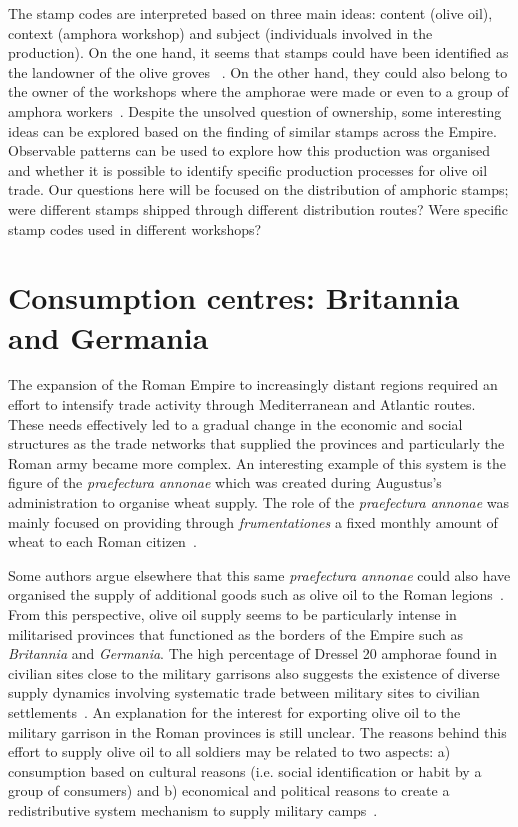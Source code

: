 The stamp codes are interpreted based on three main ideas: content (olive oil), context (amphora workshop) and subject (individuals involved in the production). On the one hand, it seems that stamps could have been identified as the landowner of the olive groves~ \citep{rodriguez_economioleicola_1977}. On the other hand, they could also belong to the owner of the workshops where the amphorae were made or even to a group of amphora workers~\citep{berni_millet_epigrafianforica_2008}. Despite the unsolved question of ownership, some interesting ideas can be explored based on the finding of similar stamps across the Empire. Observable patterns can be used to explore how this production was organised and whether it is possible to identify specific production processes for olive oil trade. Our questions here will be focused on the distribution of amphoric stamps; were different stamps shipped through different distribution routes? Were specific stamp codes used in different workshops?

\section{Consumption centres: Britannia and Germania}
\label{sec:3}

The expansion of the Roman Empire to increasingly distant regions required an effort to intensify trade activity through Mediterranean and Atlantic routes. These needs effectively led to a gradual change in the economic and social structures as the trade networks that supplied the provinces and particularly the Roman army became more complex. An interesting example of this system is the figure of the \textit{praefectura annonae} which was created during Augustus's administration to organise wheat supply. The role of the \textit{praefectura annonae} was mainly focused on providing through \textit{frumentationes} a fixed monthly amount of wheat to each Roman citizen~\citep{remesal_annona_1986,remesal_concierto}.

Some authors argue elsewhere that this same \textit{praefectura annonae} could also have organised the supply of additional goods such as olive oil to the Roman legions~\citep{remesal_annona_1986,remesal_annona_1990}. From this perspective, olive oil supply seems to be particularly intense in militarised provinces that functioned as the borders of the Empire such as \textit{Britannia} and \textit{Germania}. The high percentage of Dressel 20 amphorae found in civilian sites close to the military garrisons also suggests the existence of diverse supply dynamics involving systematic trade between military sites to civilian settlements~\citep{remesal_annona_1986, carreras_britannia_1998}. An explanation for the interest for exporting olive oil to the military garrison in the Roman provinces is still unclear. The reasons behind this effort to supply olive oil to all soldiers may be related to two aspects: a) consumption based on cultural reasons (i.e. social identification or habit by a group of consumers) and b) economical and political reasons to create a redistributive system mechanism to supply military camps~\citep[69-70]{carreras_britannia_1998}. 

